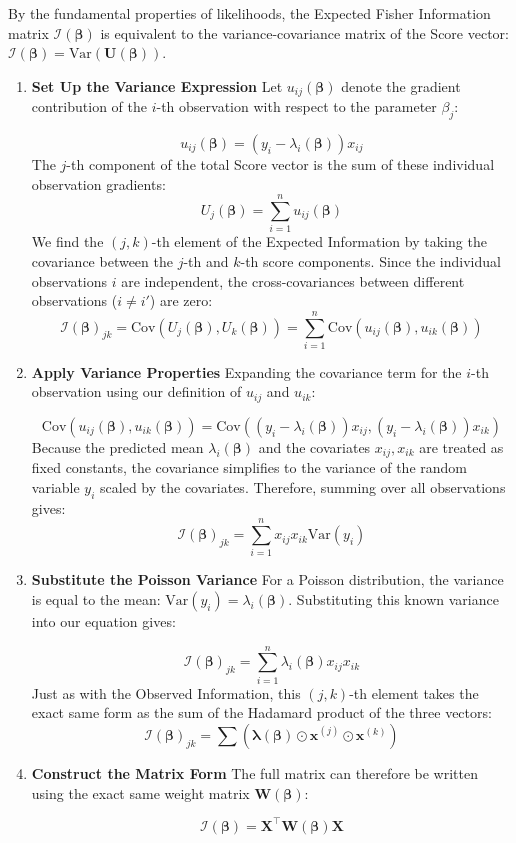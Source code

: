 \documentclass[
  letterpaper,
  DIV=11,
  numbers=noendperiod]{scrreprt}
\renewcommand{\[}{\begin{equation}}
\renewcommand{\]}{\end{equation}}
\theoremstyle{definition}
\theoremstyle{plain}
\theoremstyle{plain}
\theoremstyle{plain}
\theoremstyle{definition}
\theoremstyle{plain}
\theoremstyle{remark}
\begin{document}
By the fundamental properties of likelihoods, the Expected Fisher
Information matrix \(\mathcal{I}(\boldsymbol{\beta})\) is equivalent to
the variance-covariance matrix of the Score vector:
\(\mathcal{I}(\boldsymbol{\beta}) = \text{Var}(\mathbf{U}(\boldsymbol{\beta}))\).

\begin{enumerate}
\def\labelenumi{\arabic{enumi}.}
\item
  \textbf{Set Up the Variance Expression} Let
  \(u_{ij}(\boldsymbol{\beta})\) denote the gradient contribution of the
  \(i\)-th observation with respect to the parameter \(\beta_j\):

  \[
  u_{ij}(\boldsymbol{\beta}) = (y_i - \lambda_i(\boldsymbol{\beta})) x_{ij}
  \] The \(j\)-th component of the total Score vector is the sum of
  these individual observation gradients: \[
  U_j(\boldsymbol{\beta}) = \sum_{i=1}^n u_{ij}(\boldsymbol{\beta})
  \] We find the \((j,k)\)-th element of the Expected Information by
  taking the covariance between the \(j\)-th and \(k\)-th score
  components. Since the individual observations \(i\) are independent,
  the cross-covariances between different observations (\(i \neq i'\))
  are zero: \[
  \mathcal{I}(\boldsymbol{\beta})_{jk} = \text{Cov}(U_j(\boldsymbol{\beta}), U_k(\boldsymbol{\beta})) = \sum_{i=1}^n \text{Cov}(u_{ij}(\boldsymbol{\beta}), u_{ik}(\boldsymbol{\beta}))
  \]
\item
  \textbf{Apply Variance Properties} Expanding the covariance term for
  the \(i\)-th observation using our definition of \(u_{ij}\) and
  \(u_{ik}\):

  \[
  \text{Cov}(u_{ij}(\boldsymbol{\beta}), u_{ik}(\boldsymbol{\beta})) = \text{Cov}((y_i - \lambda_i(\boldsymbol{\beta})) x_{ij}, (y_i - \lambda_i(\boldsymbol{\beta})) x_{ik})
  \] Because the predicted mean \(\lambda_i(\boldsymbol{\beta})\) and
  the covariates \(x_{ij}, x_{ik}\) are treated as fixed constants, the
  covariance simplifies to the variance of the random variable \(y_i\)
  scaled by the covariates. Therefore, summing over all observations
  gives: \[
  \mathcal{I}(\boldsymbol{\beta})_{jk} = \sum_{i=1}^n x_{ij} x_{ik} \text{Var}(y_i)
  \]
\item
  \textbf{Substitute the Poisson Variance} For a Poisson distribution,
  the variance is equal to the mean:
  \(\text{Var}(y_i) = \lambda_i(\boldsymbol{\beta})\). Substituting this
  known variance into our equation gives:

  \[
  \mathcal{I}(\boldsymbol{\beta})_{jk} = \sum_{i=1}^n \lambda_i(\boldsymbol{\beta}) x_{ij} x_{ik}
  \] Just as with the Observed Information, this \((j,k)\)-th element
  takes the exact same form as the sum of the Hadamard product of the
  three vectors: \[
  \mathcal{I}(\boldsymbol{\beta})_{jk} = \sum \left( \boldsymbol{\lambda}(\boldsymbol{\beta}) \odot \mathbf{x}^{(j)} \odot \mathbf{x}^{(k)} \right)
  \]
\item
  \textbf{Construct the Matrix Form} The full matrix can therefore be
  written using the exact same weight matrix
  \(\mathbf{W}(\boldsymbol{\beta})\):

  \[
  \mathcal{I}(\boldsymbol{\beta}) = \mathbf{X}^\top \mathbf{W}(\boldsymbol{\beta}) \mathbf{X}
  \]
\end{enumerate}
\end{document}
